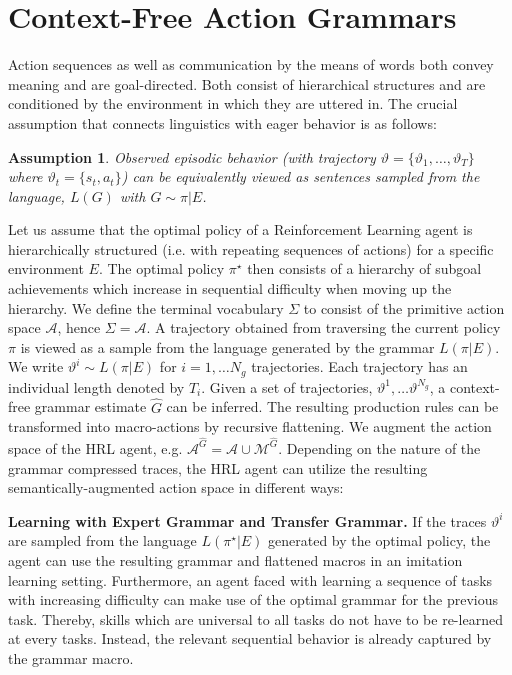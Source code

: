 \documentclass[colorinlistoftodos]{article}
\newtheorem{assumption}{Assumption}
\theoremstyle{definition}
\begin{document}
\newpage
\section{Context-Free Action Grammars}

 Action sequences as well as communication by the means of words both convey meaning and are goal-directed. Both consist of hierarchical structures and are conditioned by the environment in which they are uttered in. The crucial assumption that connects linguistics with eager behavior is as follows: 

\begin{assumption}
	Observed episodic behavior (with trajectory $\vartheta = \{\vartheta_1, \dots, \vartheta_T\}$ where $\vartheta_t =\{s_t, a_t\}$) can be equivalently viewed as sentences sampled from the language, $L(G)$ with $G \sim \pi|E$.
\end{assumption}

Let us assume that the optimal policy of a Reinforcement Learning agent is hierarchically structured (i.e. with repeating sequences of actions) for a specific environment $E$. The optimal policy $\pi^\star$ then consists of a hierarchy of subgoal achievements which increase in sequential difficulty when moving up the hierarchy.
We define the terminal vocabulary $\Sigma$ to consist of the primitive action space $\mathcal{A}$, hence $\Sigma = \mathcal{A}$.
A trajectory obtained from traversing the current policy $\pi$ is viewed as a sample from the language generated by the grammar $L(\pi|E)$. We write  $\vartheta^i \sim L(\pi|E)$ for $i = 1, \dots N_g$ trajectories. Each trajectory has an individual length denoted by $T_{i}$. Given a set of trajectories, $\vartheta^1, \dots \vartheta^{N_g}$, a context-free grammar estimate $\hat{G}$ can be inferred. The resulting production rules can be transformed into macro-actions by recursive flattening. We augment the action space of the HRL agent, e.g. $\mathcal{A}^{\hat{G}} = \mathcal{A} \cup \mathcal{M}^{\hat{G}}$. Depending on the nature of the grammar compressed traces, the HRL agent can utilize the resulting semantically-augmented action space in different ways:

\textbf{Learning with Expert Grammar and Transfer Grammar.} If the traces $\vartheta^i$ are sampled from the language $L(\pi^\star|E)$ generated by the optimal policy, the agent can use the resulting grammar and flattened macros in an imitation learning setting. Furthermore, an agent faced with learning a sequence of tasks with increasing difficulty can make use of the optimal grammar for the previous task. Thereby, skills which are universal to all tasks do not have to be re-learned at every tasks. Instead, the relevant sequential behavior is already captured by the grammar macro. 
\end{document}
